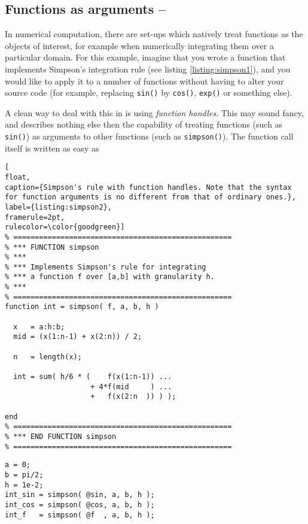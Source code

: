 \subsection{Functions as arguments -- \cleansymbol\cleansymbol\cleansymbol}

In numerical computation, there are set-ups which natively treat functions as the objects of interest, for example when numerically integrating them over a particular domain. For this example, imagine that you wrote a function that implements Simpson's integration rule (see listing \ref{listing:simpson1}), and you would like to apply it to a number of functions without having to alter your source code (for example, replacing \lstinline!sin()! by \lstinline!cos()!, \lstinline!exp()! or something else).

A clean way to deal with this in \matlab{} is using \emph{function handles}. This may sound fancy, and describes nothing else then the capability of treating functions (such as \lstinline!sin()!) as arguments to other functions (such as \lstinline!simpson()!). The function call itself is written as easy as

\begin{lstlisting}[
float,
caption={Simpson's rule with function handles. Note that the syntax for function arguments is no different from that of ordinary ones.},
label={listing:simpson2},
framerule=2pt,
rulecolor=\color{goodgreen}]
% ===================================================
% *** FUNCTION simpson
% ***
% *** Implements Simpson's rule for integrating
% *** a function f over [a,b] with granularity h.
% ***
% ===================================================
function int = simpson( f, a, b, h )

  x   = a:h:b;
  mid = (x(1:n-1) + x(2:n)) / 2;

  n   = length(x);

  int = sum( h/6 * (    f(x(1:n-1)) ...
                    + 4*f(mid     ) ...
                    +   f(x(2:n  )) ) );

end 
% ===================================================
% *** END FUNCTION simpson
% ===================================================
\end{lstlisting}

\hfill
\begin{minipage}[t]{.90\textwidth}
\begin{lstlisting}[framerule=1pt,rulecolor=\color{goodgreen}]
a = 0;
b = pi/2;
h = 1e-2;
int_sin = simpson( @sin, a, b, h );
int_cos = simpson( @cos, a, b, h );
int_f   = simpson( @f  , a, b, h );
\end{lstlisting}
\end{minipage}
\hfill

